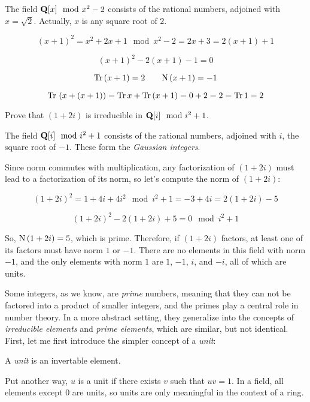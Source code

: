 The field ${\bf Q}[x] \mod x^2-2$ consists of the rational numbers,
adjoined with $x=\sqrt{2}$.  Actually, $x$ is any square root of $2$.

$$(x+1)^2 = x^2+2x+1 \mod x^2-2 = 2x+3 = 2(x+1) + 1$$

$$(x+1)^2 - 2(x+1) - 1 = 0$$

$${\rm Tr\,} (x+1) = 2 \qquad {\rm N\,} (x+1) = -1$$

$${\rm Tr\,} \left(x + (x+1)\right) = {\rm Tr\,} x + {\rm Tr\,} (x+1) = 0 + 2 = 2 = {\rm Tr\,} 1 = 2$$

\endexample

\example Prove that $(1+2i)$ is irreducible in ${\bf Q}[i] \mod i^2+1$.

The field ${\bf Q}[i] \mod i^2+1$ consists of the rational numbers,
adjoined with $i$, the square root of $-1$.  These form the {\it
Gaussian integers}.

Since norm commutes with multiplication, any factorization of $(1+2i)$
must lead to a factorization of its norm, so let's compute the norm
of $(1+2i)$:

$$(1+2i)^2 = 1 +4i +4i^2 \mod i^2+1 = -3+4i = 2(1+2i) - 5$$

$$(1+2i)^2 - 2(1+2i) +5 =0 \mod i^2+1$$

So, ${\rm N\,}(1+2i) = 5$, which is prime.  Therefore, if $(1+2i)$ factors,
at least one of its factors must have norm $1$ or $-1$.  There
are no elements in this field with norm $-1$, and the only
elements with norm $1$ are $1$, $-1$, $i$, and $-i$, all
of which are units.

\endexample


\vfill\eject


Some integers, as we know, are {\it prime} numbers, meaning that they
can not be factored into a product of smaller integers, and the primes
play a central role in number theory.  In a more abstract setting,
they generalize into the concepts of {\it irreducible elements} and
{\it prime elements}, which are similar, but not identical.
First, let me
first introduce the simpler concept of a {\it unit}:

\begin{key point}
A {\it unit} is an invertable element.
\end{key point}

Put another way, $u$ is a unit if there exists $v$ such that $uv=1$.
In a field, all elements except 0 are units, so units are only
meaningful in the context of a ring.

